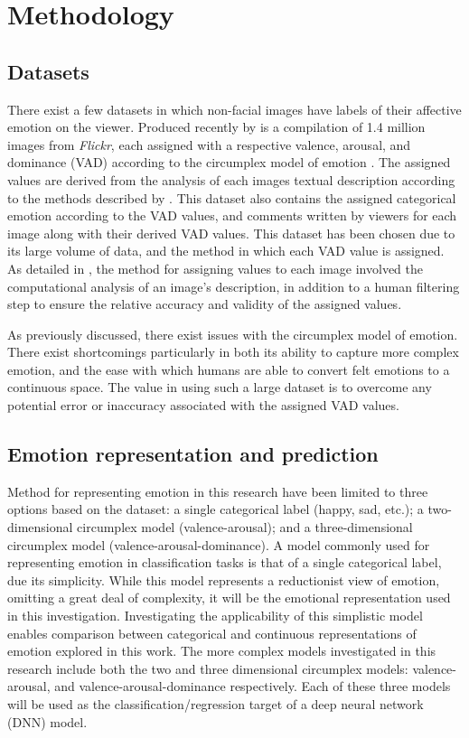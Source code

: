\documentclass{article}
\begin{document}
\section{Methodology}

\subsection{Datasets}

There exist a few datasets in which non-facial images have labels of their affective emotion on the viewer.
Produced recently by \citep{zhao2016predicting} is a compilation of 1.4 million images from \textit{Flickr}, each assigned with a respective valence, arousal, and dominance (VAD) according to the circumplex model of emotion \citep{russell1980circumplex, bradley1994measuring}.
The assigned values are derived from the analysis of each images textual description according to the methods described by \citet{warriner2013norms}.
This dataset also contains the assigned categorical emotion according to the VAD values, and comments written by viewers for each image along with their derived VAD values.
This dataset has been chosen due to its large volume of data, and the method in which each VAD value is assigned.
As detailed in \citet{zhao2016predicting}, the method for assigning values to each image involved the computational analysis of an image's description, in addition to a human filtering step to ensure the relative accuracy and validity of the assigned values.

As previously discussed, there exist issues with the circumplex model of emotion.
There exist shortcomings particularly in both its ability to capture more complex emotion, and the ease with which humans are able to convert felt emotions to a continuous space.
The value in using such a large dataset is to overcome any potential error or inaccuracy associated with the assigned VAD values.


\subsection{Emotion representation and prediction}
Method for representing emotion in this research have been limited to three options based on the dataset: a single categorical label (happy, sad, etc.); a two-dimensional circumplex model (valence-arousal); and a three-dimensional circumplex model (valence-arousal-dominance).
A model commonly used for representing emotion in classification tasks is that of a single categorical label, due its simplicity.
While this model represents a reductionist view of emotion, omitting a great deal of complexity, it will be the emotional representation used in this investigation.
Investigating the applicability of this simplistic model enables comparison between categorical and continuous representations of emotion explored in this work.
The more complex models investigated in this research include both the two and three dimensional circumplex models: valence-arousal, and valence-arousal-dominance respectively.
Each of these three models will be used as the classification/regression target of a deep neural network (DNN) model.
\end{document}
